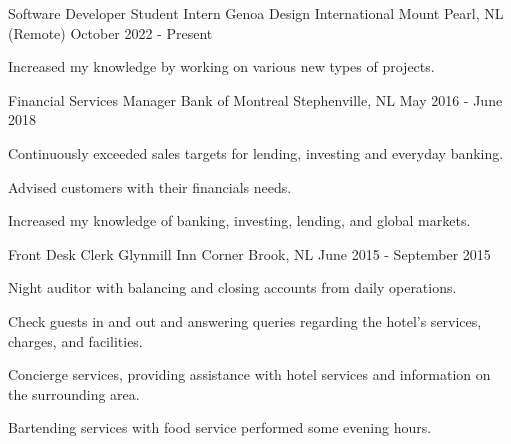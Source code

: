 

\begin{cventries}

  \cventry
    {Software Developer Student Intern} %
    {Genoa Design International} %
    {Mount Pearl, NL (Remote)} %
    {October 2022 - Present} %
    {
      \begin{cvitems} %
        \item {Increased my knowledge by working on various new types of projects.}
      \end{cvitems}
    }

  \cventry
    {Financial Services Manager} %
    {Bank of Montreal} %
    {Stephenville, NL} %
    {May 2016 - June 2018} %
    {
      \begin{cvitems} %
        \item {Continuously exceeded sales targets for lending, investing and everyday banking.}
        \item {Advised customers with their financials needs.}
        \item {Increased my knowledge of banking, investing, lending, and global markets.}
      \end{cvitems}
    }

  \cventry
    {Front Desk Clerk} %
    {Glynmill Inn} %
    {Corner Brook, NL} %
    {June 2015 - September 2015} %
    {
      \begin{cvitems} %
        \item {Night auditor with balancing and closing accounts from daily operations.}
        \item {Check guests in and out and answering queries regarding the hotel's services, charges, and facilities.}
        \item {Concierge services, providing assistance with hotel services and information on the surrounding area.}
		\item {Bartending services with food service performed some evening hours.}
      \end{cvitems}
    }


\end{cventries}
